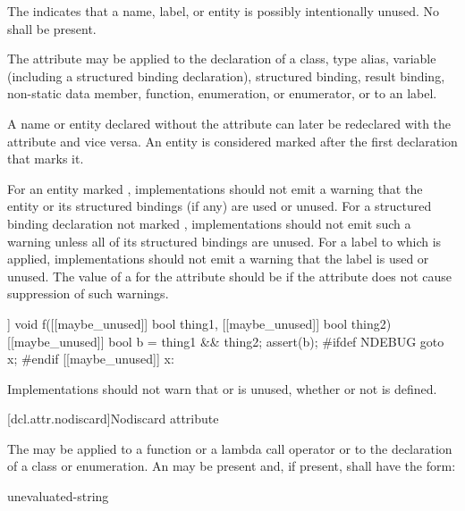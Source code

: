 \pnum
The  
indicates that a name, label, or entity is possibly intentionally unused.
No  shall be present.

\pnum
The attribute may be applied to the declaration of a class,
type alias,
variable (including a structured binding declaration),
structured binding,
result binding,
non-static data member,
function,
enumeration, or
enumerator, or
to an  label.

\pnum
A name or entity declared without the  attribute
can later be redeclared with the attribute
and vice versa.
An entity is considered marked
after the first declaration that marks it.

\pnum
\recommended
For an entity marked ,
implementations should not emit a warning
that the entity or its structured bindings (if any)
are used or unused.
For a structured binding declaration not marked ,
implementations should not emit such a warning unless
all of its structured bindings are unused.
For a label to which  is applied,
implementations should not emit a warning that the label is used or unused.
The value of
a  for the  attribute
should be 
if the attribute does not cause suppression of such warnings.

\pnum
\begin{example}
\begin{codeblock}
[[maybe_unused]] void f([[maybe_unused]] bool thing1,
                        [[maybe_unused]] bool thing2) {
  [[maybe_unused]] bool b = thing1 && thing2;
  assert(b);
#ifdef NDEBUG
  goto x;
#endif
  [[maybe_unused]] x:
}
\end{codeblock}
Implementations should not warn that  or  is unused,
whether or not  is defined.
\end{example}

[dcl.attr.nodiscard]{Nodiscard attribute}%

\pnum
The  
may be applied to a function or a lambda call operator or
to the declaration of a class or enumeration.
An  may be present
and, if present, shall have the form:

\begin{ncbnf}
\terminal{(} unevaluated-string \terminal{)}
\end{ncbnf}


